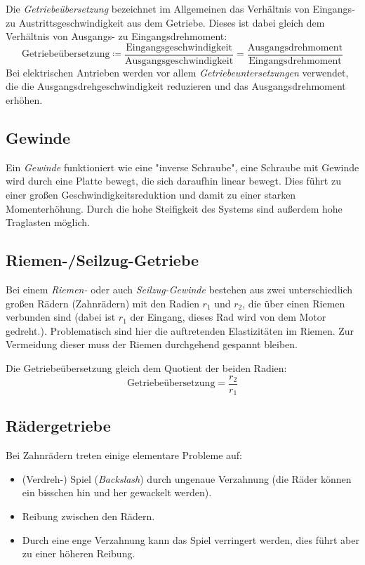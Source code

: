 		Die \emph{Getriebeübersetzung} bezeichnet im Allgemeinen das Verhältnis von Eingangs- zu Austrittsgeschwindigkeit aus dem Getriebe. Dieses ist dabei gleich dem Verhältnis von Ausgangs- zu Eingangsdrehmoment:
		\begin{equation*}
			\text{Getriebeübersetzung} \coloneqq \frac{\text{Eingangsgeschwindigkeit}}{\text{Ausgangsgeschwindigkeit}} = \frac{\text{Ausgangsdrehmoment}}{\text{Eingangsdrehmoment}}
		\end{equation*}
		Bei elektrischen Antrieben werden vor allem \emph{Getriebeuntersetzungen} verwendet, die die Ausgangsdrehgeschwindigkeit reduzieren und das Ausgangsdrehmoment erhöhen.

		\subsection{Gewinde}
			Ein \emph{Gewinde} funktioniert wie eine "inverse Schraube", \dh eine Schraube mit Gewinde wird durch eine Platte bewegt, die sich daraufhin linear bewegt. Dies führt zu einer großen Geschwindigkeitsreduktion und damit zu einer starken Momenterhöhung. Durch die hohe Steifigkeit des Systems sind außerdem hohe Traglasten möglich.

		\subsection{Riemen-/Seilzug-Getriebe}
			Bei einem \emph{Riemen-} oder auch \emph{Seilzug-Gewinde} bestehen aus zwei unterschiedlich großen Rädern (\zB Zahnrädern) mit den Radien \(r_1\) und \(r_2\), die über einen Riemen verbunden sind (dabei ist \(r_1\) der Eingang, \dh dieses Rad wird von dem Motor gedreht.). Problematisch sind hier die auftretenden Elastizitäten im Riemen. Zur Vermeidung dieser muss der Riemen durchgehend gespannt bleiben.

			Die Getriebeübersetzung gleich dem Quotient der beiden Radien:
			\begin{equation*}
				\text{Getriebeübersetzung} = \frac{r_2}{r_1}
			\end{equation*}

		\subsection{Rädergetriebe}
			Bei Zahnrädern treten einige elementare Probleme auf:
			\begin{itemize}
				\item (Verdreh-) Spiel (\emph{Backslash}) durch ungenaue Verzahnung (\dh die Räder können ein bisschen hin und her gewackelt werden).
				\item Reibung zwischen den Rädern.
				\item Durch eine enge Verzahnung kann das Spiel verringert werden, dies führt aber zu einer höheren Reibung.
			\end{itemize}

